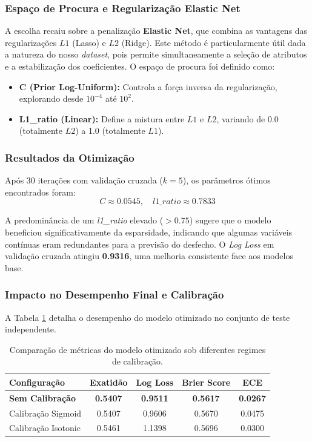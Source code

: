 \documentclass[10pt]{article}
\begin{document}
\subsubsection{Espaço de Procura e Regularização Elastic Net}
A escolha recaiu sobre a penalização \textbf{Elastic Net}, que combina as vantagens das regularizações $L1$ (Lasso) e $L2$ (Ridge). Este método é particularmente útil dada a natureza do nosso \textit{dataset}, pois permite simultaneamente a seleção de atributos e a estabilização dos coeficientes. O espaço de procura foi definido como:
\begin{itemize}
    \item \textbf{C (Prior Log-Uniform):} Controla a força inversa da regularização, explorando desde $10^{-4}$ até $10^{2}$.
    \item \textbf{L1\_ratio (Linear):} Define a mistura entre $L1$ e $L2$, variando de 0.0 (totalmente $L2$) a 1.0 (totalmente $L1$).
\end{itemize}

\subsubsection{Resultados da Otimização}
Após 30 iterações com validação cruzada ($k=5$), os parâmetros ótimos encontrados foram:
\begin{equation}
    C \approx 0.0545, \quad l1\_ratio \approx 0.7833
\end{equation}

A predominância de um \textit{l1\_ratio} elevado ($> 0.75$) sugere que o modelo beneficiou significativamente da esparsidade, indicando que algumas variáveis contínuas eram redundantes para a previsão do desfecho. O \textit{Log Loss} em validação cruzada atingiu \textbf{0.9316}, uma melhoria consistente face aos modelos base.

\subsubsection{Impacto no Desempenho Final e Calibração}
A Tabela \ref{tab:optimized_metrics} detalha o desempenho do modelo otimizado no conjunto de teste independente.

\begin{table}[H]
\centering
\caption{Comparação de métricas do modelo otimizado sob diferentes regimes de calibração.}
\label{tab:optimized_metrics}
\begin{tabular}{lcccc}
\hline
\textbf{Configuração} & \textbf{Exatidão} & \textbf{Log Loss} & \textbf{Brier Score} & \textbf{ECE} \\ \hline
\textbf{Sem Calibração} & \textbf{0.5407} & \textbf{0.9511} & \textbf{0.5617} & \textbf{0.0267} \\
Calibração Sigmoid & 0.5407 & 0.9606 & 0.5670 & 0.0475 \\
Calibração Isotonic & 0.5461 & 1.1398 & 0.5696 & 0.0300 \\ \hline
\end{tabular}
\end{table}
\end{document}
